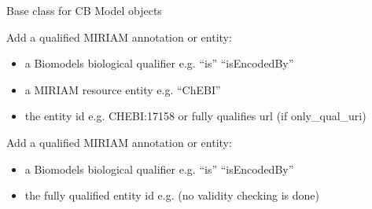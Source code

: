 \documentclass[letterpaper,10pt,english]{sphinxmanual}
\begin{document}
\begin{fulllineitems}
\label{\detokenize{modules_doc:cbmpy.CBModel.Fbase}}
\pysigstartsignatures
{}
\pysigstopsignatures
\sphinxAtStartPar
Base class for CB Model objects

\begin{fulllineitems}
\label{\detokenize{modules_doc:cbmpy.CBModel.Fbase.addMIRIAMannotation}}
\pysigstartsignatures
{}
\pysigstopsignatures
\sphinxAtStartPar
Add a qualified MIRIAM annotation or entity:
\begin{itemize}
\item {} 
\sphinxAtStartPar
{} a Biomodels biological qualifier e.g. “is” “isEncodedBy”

\item {} 
\sphinxAtStartPar
{} a MIRIAM resource entity e.g. “ChEBI”

\item {} 
\sphinxAtStartPar
{} the entity id e.g. CHEBI:17158 or fully qualifies url (if only\_qual\_uri)

\end{itemize}

\end{fulllineitems}


\begin{fulllineitems}
\label{\detokenize{modules_doc:cbmpy.CBModel.Fbase.addMIRIAMuri}}
\pysigstartsignatures
{}
\pysigstopsignatures
\sphinxAtStartPar
Add a qualified MIRIAM annotation or entity:
\begin{itemize}
\item {} 
\sphinxAtStartPar
{} a Biomodels biological qualifier e.g. “is” “isEncodedBy”

\item {} 
\sphinxAtStartPar
{} the fully qualified entity id e.g.  (no validity checking is done)


\end{itemize}
\end{fulllineitems}
\end{fulllineitems}
\end{document}
